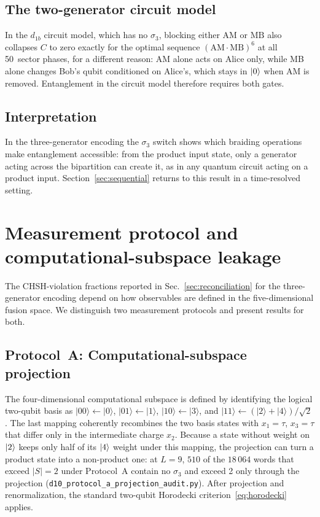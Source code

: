\documentclass[aps,pra,twocolumn,superscriptaddress,longbibliography,floatfix,nofootinbib]{revtex4-2}
\begin{document}
\subsection{The two-generator circuit model}

In the $d_{1b}$ circuit model, which has no $\sigma_3$, blocking either
$\text{AM}$ or $\text{MB}$ also collapses $C$ to zero exactly for the
optimal sequence $(\text{AM}\cdot\text{MB})^6$ at all 50~sector phases,
for a different reason: AM alone acts on Alice only, while MB alone
changes Bob's qubit conditioned on Alice's, which stays in $\ket{0}$
when AM is removed. Entanglement in the circuit model therefore requires
both gates.

\subsection{Interpretation}

In the three-generator encoding the $\sigma_3$ switch shows which
braiding operations make entanglement accessible: from the product input
state, only a generator acting across the bipartition can create it, as
in any quantum circuit acting on a product input.
Section~\ref{sec:sequential} returns to this result in a time-resolved
setting.



\section{Measurement protocol and computational-subspace leakage}
\label{sec:protocol}

The CHSH-violation fractions reported in Sec.~\ref{sec:reconciliation}
for the three-generator encoding depend on how observables are defined
in the five-dimensional fusion space.
We distinguish two measurement protocols and present results for both.

\subsection{Protocol~A: Computational-subspace projection}

The four-dimensional computational subspace is defined by identifying
the logical two-qubit basis as
$|00\rangle \leftarrow |0\rangle$,
$|01\rangle \leftarrow |1\rangle$,
$|10\rangle \leftarrow |3\rangle$, and
$|11\rangle \leftarrow (|2\rangle + |4\rangle)/\sqrt{2}$.
The last mapping coherently recombines the two basis states with
$x_1=\tau$, $x_3=\tau$ that differ only in the intermediate charge
$x_2$. Because a state without weight on $\ket{2}$ keeps only half of
its $\ket{4}$ weight under this mapping, the projection can turn a
product state into a non-product one: at $L=9$, $510$ of the $18\,064$
words that exceed $|S| = 2$ under Protocol~A contain no $\sigma_3$ and
exceed 2 only through the projection
(\texttt{d10\_protocol\_a\_projection\_audit.py}).
After projection and renormalization, the standard two-qubit
Horodecki criterion~\eqref{eq:horodecki} applies.
\end{document}
